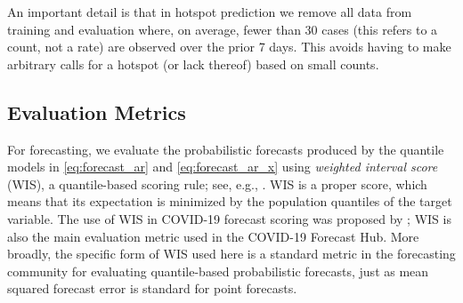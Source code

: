 \documentclass[9pt,twocolumn,twoside,lineno]{pnas-new}
\begin{document}
An important detail is that in hotspot prediction we remove all data from
training and evaluation where, on average, fewer than 30 cases (this refers to a
count, not a rate) are observed over the prior 7 days. This avoids having to
make arbitrary calls for a hotspot (or lack thereof) based on small counts.   

\subsection{Evaluation Metrics}

For forecasting, we evaluate the probabilistic forecasts produced by the
quantile models in \eqref{eq:forecast_ar} and \eqref{eq:forecast_ar_x} using
\textit{weighted interval score} (WIS), a quantile-based scoring rule; see,
e.g., \cite{Gneiting:2007}.  WIS is a proper score, which means that its
expectation is minimized by the population quantiles of the target variable.
The use of WIS in COVID-19 forecast scoring was proposed by \cite{Bracher:2021}; 
WIS is also the main evaluation metric used in the COVID-19 Forecast Hub. More
broadly, the specific form of WIS used here is a standard metric in the
forecasting community for evaluating quantile-based probabilistic forecasts,
just as mean squared forecast error is standard for point forecasts.
\end{document}
